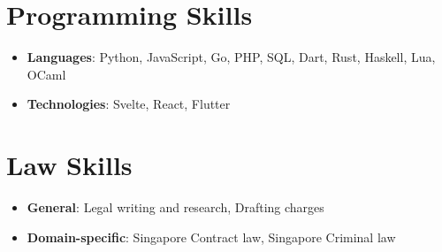 \documentclass[letterpaper,11pt]{article}
\newcommand{\resumeItem}[2]{
  \item\small{
    \textbf{#1}{: #2 \vspace{-2pt}}
  }
}
\newcommand{\resumeSubItem}[2]{\resumeItem{#1}{#2}\vspace{-4pt}}
\newcommand{\resumeSubHeadingListStart}{\begin{itemize}[leftmargin=*]}
\newcommand{\resumeSubHeadingListEnd}{\end{itemize}}
\begin{document}
\section{Programming Skills}
 \resumeSubHeadingListStart
   \resumeSubItem{Languages}
      {Python, JavaScript, Go, PHP, SQL, Dart, Rust, Haskell, Lua, OCaml}
   \resumeSubItem{Technologies}
      {Svelte, React, Flutter}
 \resumeSubHeadingListEnd

 \section{Law Skills}
 \resumeSubHeadingListStart
   \resumeSubItem{General}
      {Legal writing and research, Drafting charges}
   \resumeSubItem{Domain-specific}
      {Singapore Contract law, Singapore Criminal law}
 \resumeSubHeadingListEnd

\end{document}
